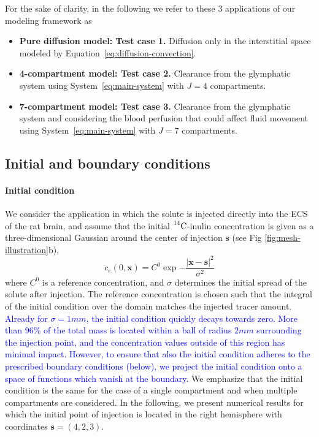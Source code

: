 \documentclass[10pt]{article}
\newcommand{\1}{^{(1)}}
\newcommand{\2}{^{(2)}}
\newcommand {\x}   {\mathbf{x}}
\newcommand{\Cinulin}{$\prescript{14}{}{\text{C}}$-inulin }
\newcommand{\corr}[1]{\textcolor{blue}{#1}}
\begin{document}
For the sake of clarity, in the following we refer to these $3$ applications of our modeling framework as
\begin{itemize}
    \item \textbf{Pure diffusion model: Test case 1.} Diffusion only in the interstitial space modeled by Equation~\eqref{eq:diffusion-convection}. 
    \item \textbf{4-compartment model: Test case 2.} Clearance from the glymphatic system using System~\eqref{eq:main-system} with $J=4$ compartments. 
    \item \textbf{7-compartment model: Test case 3.} Clearance from the glymphatic system and considering the blood perfusion that could affect fluid movement using System~\eqref{eq:main-system} with $J=7$ compartments. 
\end{itemize}


\subsection{Initial and boundary conditions} \label{subsec:Init-bound}
\paragraph{Initial condition}

We consider the application in which the solute is injected directly into the ECS of the rat brain, and assume that the initial \Cinulin concentration is given as a three-dimensional Gaussian around the center of injection $ \mathbf{s} $ (see Fig \ref{fig:mesh-illustration}b),
\begin{equation}
    c_e(0, \x) = C^0 \exp{-\frac{|\x - \mathbf{s}|^2}{\sigma^2}} 
    \label{eq:inulin-initial}
\end{equation}
where $C^0$ is a reference concentration, and $ \sigma $ determines the initial spread of the solute after injection. The reference concentration is chosen such that the integral of the initial condition over the domain matches the injected tracer amount. \corr{ Already for $\sigma = 1\si{mm}$, the initial condition quickly decays towards zero. More than 96\% of the total mass is located within a ball of radius $2\si{mm}$ surrounding the injection point, and the concentration values outside of this region has minimal impact. However, to ensure that also the initial condition adheres to the prescribed boundary conditions (below), we project the initial condition onto a space of functions which vanish at the boundary.} We emphasize that the initial condition is the same for the case of a single compartment and when multiple compartments are considered. In the following, we present numerical results for which the initial point of injection is located in the right hemisphere with coordinates $\mathbf{s} = (4,2,3)$. 
\end{document}
